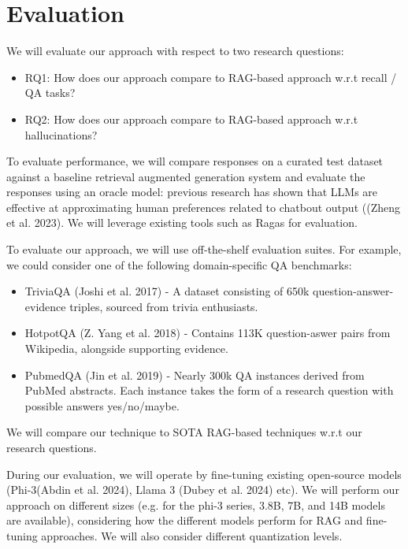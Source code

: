 \section{Evaluation}
We will evaluate our approach with respect to two research questions:

\begin{itemize}
\item RQ1: How does our approach compare to RAG-based approach w.r.t recall / QA tasks?
\item RQ2: How does our approach compare to RAG-based approach w.r.t hallucinations?
\end{itemize}

To evaluate performance, we will compare responses on a curated test dataset
against a baseline retrieval augmented generation system and evaluate the
responses using an oracle model: previous research has shown that LLMs are
effective at approximating human preferences related to chatbout output ((Zheng
et al. 2023). We will leverage existing tools such as Ragas \citep{ragas} for
evaluation.

To evaluate our approach, we will use off-the-shelf evaluation suites. For example, we could consider one of the following domain-specific QA benchmarks:

\begin{itemize}
\item TriviaQA (Joshi et al. 2017) - A dataset consisting of 650k question-answer-evidence triples, sourced from trivia enthusiasts.
\item HotpotQA (Z. Yang et al. 2018) - Contains 113K question-aswer pairs from Wikipedia, alongside supporting evidence.
\item PubmedQA (Jin et al. 2019) - Nearly 300k QA instances derived from PubMed abstracts. Each instance takes the form of a research question with possible answers yes/no/maybe.
\end{itemize}

We will compare our technique to SOTA RAG-based techniques w.r.t our research questions.

During our evaluation, we will operate by fine-tuning existing open-source
models (Phi-3(Abdin et al. 2024), Llama 3 (Dubey et al. 2024) etc). We will
perform our approach on different sizes (e.g. for the phi-3 series, 3.8B, 7B,
and 14B models are available), considering how the different models perform for
RAG and fine-tuning approaches. We will also consider different quantization
levels.
